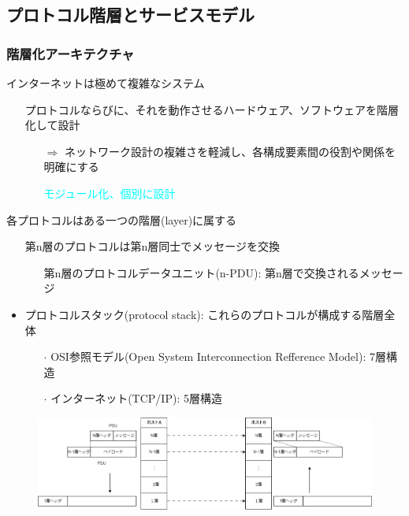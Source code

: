 \subsection{プロトコル階層とサービスモデル}

\subsubsection{階層化アーキテクチャ}

インターネットは極めて複雑なシステム
\begin{itemize}
  \item[] プロトコルならびに、それを動作させるハードウェア、ソフトウェアを階層化して設計
  \begin{itemize}
    \item[$\Rightarrow$] ネットワーク設計の複雑さを軽減し、各構成要素間の役割や関係を明確にする
    \item[] \textcolor{cyan}{モジュール化、個別に設計}
  \end{itemize}
\end{itemize}

各プロトコルはある一つの階層(layer)に属する
\begin{itemize}
  \item[] 第n層のプロトコルは第n層同士でメッセージを交換
  \begin{itemize}
    \item[] 第n層のプロトコルデータユニット(n-PDU): 第n層で交換されるメッセージ
  \end{itemize}
\end{itemize}

\begin{itemize}
  \item プロトコルスタック(protocol stack): これらのプロトコルが構成する階層全体
  \begin{itemize}
    \item[$\cdot$] OSI参照モデル(Open System Interconnection Refference Model): 7層構造
    \item[$\cdot$] インターネット(TCP/IP): 5層構造
  \end{itemize}
\end{itemize}

\begin{figure}[h]
  \centering
  \includegraphics[width=0.8\linewidth]{image/npu.png}
\end{figure}


